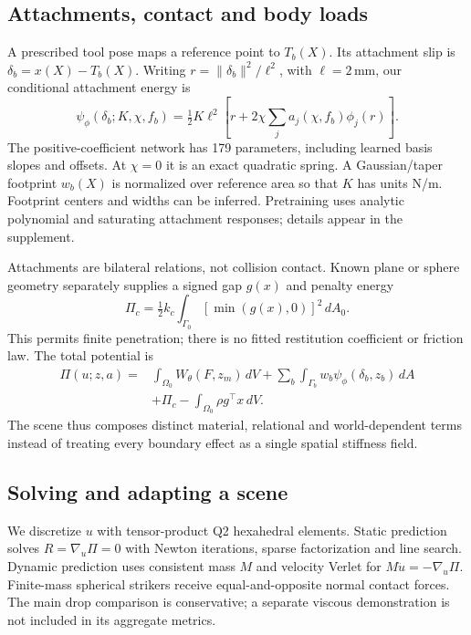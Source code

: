 \documentclass[10pt,twocolumn,letterpaper]{article}
\begin{document}
\subsection{Attachments, contact and body loads}
A prescribed tool pose maps a reference point to $T_b(X)$. Its attachment slip is $\delta_b=x(X)-T_b(X)$. Writing $r=\|\delta_b\|^2/\ell^2$, with $\ell=2$\,mm, our conditional attachment energy is
\begin{equation}
 \psi_\phi(\delta_b;K,\chi,f_b)=\tfrac12K\ell^2\left[r+2\chi\sum_j a_j(\chi,f_b)\phi_j(r)\right].
\end{equation}
The positive-coefficient network has 179 parameters, including learned basis slopes and offsets. At $\chi=0$ it is an exact quadratic spring. A Gaussian/taper footprint $w_b(X)$ is normalized over reference area so that $K$ has units N/m. Footprint centers and widths can be inferred. Pretraining uses analytic polynomial and saturating attachment responses; details appear in the supplement.

Attachments are bilateral relations, not collision contact. Known plane or sphere geometry separately supplies a signed gap $g(x)$ and penalty energy
\begin{equation}
 \Pi_c=\tfrac12 k_c\int_{\Gamma_0}[\min(g(x),0)]^2\,dA_0.
\end{equation}
This permits finite penetration; there is no fitted restitution coefficient or friction law. The total potential is
\begin{align}\label{eq:total}
 \Pi(u;z,a)={}&\int_{\Omega_0}W_\theta(F,z_m)\,dV
 +\sum_b\int_{\Gamma_b}w_b\psi_\phi(\delta_b,z_b)\,dA\nonumber\\
 &+\Pi_c-\int_{\Omega_0}\rho g^\top x\,dV.
\end{align}
The scene thus composes distinct material, relational and world-dependent terms instead of treating every boundary effect as a single spatial stiffness field.

\subsection{Solving and adapting a scene}
We discretize $u$ with tensor-product Q2 hexahedral elements. Static prediction solves $R=\nabla_u\Pi=0$ with Newton iterations, sparse factorization and line search. Dynamic prediction uses consistent mass $M$ and velocity Verlet for $M\ddot u=-\nabla_u\Pi$. Finite-mass spherical strikers receive equal-and-opposite normal contact forces. The main drop comparison is conservative; a separate viscous demonstration is not included in its aggregate metrics.
\end{document}
